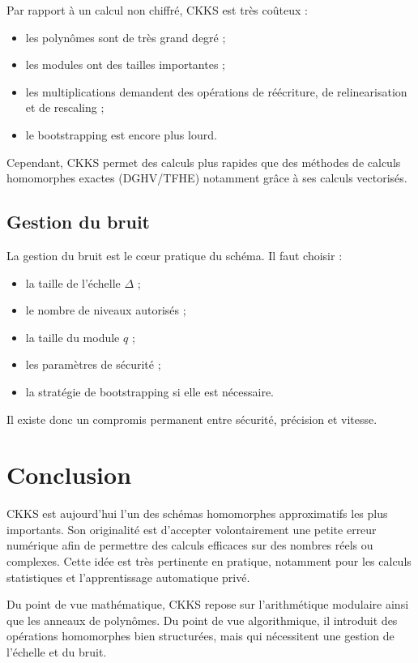 \documentclass[11pt,a4paper]{article}
\begin{document}
Par rapport à un calcul non chiffré, CKKS est très coûteux :
\begin{itemize}[leftmargin=2em]
  \item les polynômes sont de très grand degré ;
  \item les modules ont des tailles importantes ;
  \item les multiplications demandent des opérations de réécriture, de relinearisation et de rescaling ;
  \item le bootstrapping est encore plus lourd.
\end{itemize}

Cependant, CKKS permet des calculs plus rapides que des méthodes de calculs homomorphes exactes (DGHV/TFHE) notamment grâce à ses calculs vectorisés.

\subsection{Gestion du bruit}

La gestion du bruit est le cœur pratique du schéma. Il faut choisir :
\begin{itemize}[leftmargin=2em]
  \item la taille de l'échelle $\Delta$ ;
  \item le nombre de niveaux autorisés ;
  \item la taille du module $q$ ;
  \item les paramètres de sécurité ;
  \item la stratégie de bootstrapping si elle est nécessaire.
\end{itemize}

Il existe donc un compromis permanent entre sécurité, précision et vitesse.

\section{Conclusion}

CKKS est aujourd'hui l'un des schémas homomorphes approximatifs les plus importants. Son originalité est d'accepter volontairement une petite erreur numérique afin de permettre des calculs efficaces sur des nombres réels ou complexes. Cette idée est très pertinente en pratique, notamment pour les calculs statistiques et l'apprentissage automatique privé.

Du point de vue mathématique, CKKS repose sur l'arithmétique modulaire ainsi que les anneaux de polynômes. Du point de vue algorithmique, il introduit des opérations homomorphes bien structurées, mais qui nécessitent une gestion de l'échelle et du bruit.
\end{document}
